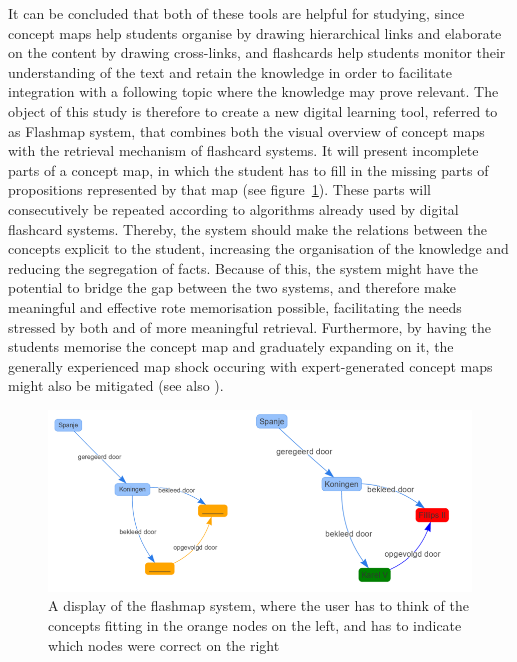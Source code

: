 It can be concluded that both of these tools are helpful for studying, since concept maps help students organise by drawing hierarchical links and elaborate on the content by drawing cross-links, and flashcards help students monitor their understanding of the text and retain the knowledge in order to facilitate integration with a following topic where the knowledge may prove relevant. The object of this study is therefore to create a new digital learning tool, referred to as Flashmap system, that combines both the visual overview of concept maps with the retrieval mechanism of flashcard systems. It will present incomplete parts of a concept map, in which the student has to fill in the missing parts of propositions represented by that map (see figure~\ref{fig:flashmap}). These parts will consecutively be repeated according to algorithms already used by digital flashcard systems. Thereby, the system should make the relations between the concepts explicit to the student, increasing the organisation of the knowledge and reducing the segregation of facts. Because of this, the system might have the potential to bridge the gap between the two systems, and therefore make meaningful and effective rote memorisation possible, facilitating the needs stressed by both  and  of more meaningful retrieval. Furthermore, by having the students memorise the concept map and graduately expanding on it, the generally experienced map shock occuring with expert-generated concept maps might also be mitigated (see also ).

\begin{figure}
    \centering
    \includegraphics[width=\textwidth]{img/flashmap}
    \caption{A display of the flashmap system, where the user has to think of the concepts fitting in the orange nodes on the left, and has to indicate which nodes were correct on the right}
    \label{fig:flashmap}
\end{figure}

